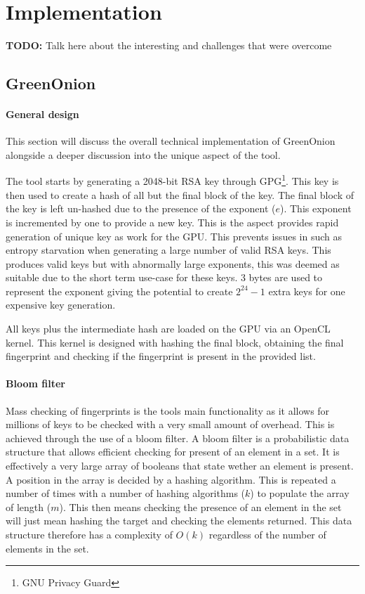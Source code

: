\chapter{Implementation}
\label{cha:Implementation}

\textbf{TODO: } Talk here about the interesting and challenges that were overcome

\section{GreenOnion}

\subsubsection{General design}
This section will discuss the overall technical implementation of GreenOnion alongside a deeper discussion into the unique aspect of the tool.

The tool starts by generating a 2048-bit RSA key through GPG\footnote{GNU Privacy Guard}. This key is then used to create a hash of all but the final block of the key. The final block of the key is left un-hashed due to the presence of the exponent ($e$). This exponent is incremented by one to provide a new key. This is the aspect provides rapid generation of unique key as work for the GPU. This prevents issues in such as entropy starvation when generating a large number of valid RSA keys. This produces valid keys but with abnormally large exponents, this was deemed as suitable due to the short term use-case for these keys. 3 bytes are used to represent the exponent giving the potential to create $2^{24} - 1$ extra keys for one expensive key generation.

All keys plus the intermediate hash are loaded on the GPU via an OpenCL kernel. This kernel is designed with hashing the final block, obtaining the final fingerprint and checking if the fingerprint is present in the provided list.

\subsubsection{Bloom filter}

Mass checking of fingerprints is the tools main functionality as it allows for millions of keys to be checked with a very small amount of overhead. This is achieved through the use of a bloom filter. A bloom filter is a probabilistic data structure that allows efficient checking for present of an element in a set. It is effectively a very large array of booleans that state wether an element is present. A position in the array is decided by a hashing algorithm. This is repeated a number of times with a number of hashing algorithms ($k$) to populate the array of length ($m$). This then means checking the presence of an element in the set will just mean hashing the target and checking the elements returned. This data structure therefore has a complexity of $O(k)$ regardless of the number of elements in the set.

